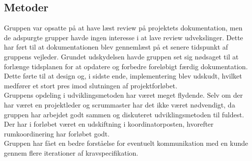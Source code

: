 \subsection{Metoder}
Gruppen var opsatte på at have læst review på projektets dokumentation, men de adspurgte grupper havde ingen interesse i at lave review udvekslinger. Dette har ført til at dokumentationen blev gennemlæst på et senere tidspunkt af gruppens vejleder. Grundet udskydelsen havde gruppen set sig nødsaget til at forlænge tidsplanen for at opdatere og forbedre foreløbigt færdig dokumentation. Dette førte til at design og, i sidste ende, implementering blev udskudt, hvilket medfører et stort pres imod slutningen af projektforløbet.\\
Gruppens opdeling i udviklingsmetoden har været meget flydende. Selv om der har været en projektleder og scrummaster har det ikke været nødvendigt, da gruppen har arbejdet godt sammen og diskuteret udviklingsmetoden til fuldest. Der har i forløbet været en udskiftning i koordinatorposten, hvorefter rumkoordinering har forløbet godt.\\
Gruppen har fået en bedre forståelse for eventuelt kommunikation med en kunde gennem flere iterationer af kravspecifikation.